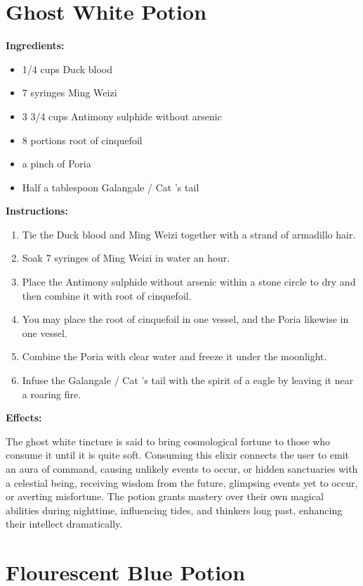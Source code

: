 \documentclass{article}
\begin{document}
\newpage
\section*{Ghost White Potion}

\textbf{Ingredients:}

\begin{itemize}
  \item 1/4 cups Duck blood
  \item 7 syringes Ming Weizi
  \item 3 3/4 cups Antimony sulphide without arsenic
  \item 8 portions root of cinquefoil
  \item a pinch of Poria
  \item Half a tablespoon Galangale / Cat 's tail
\end{itemize}

\textbf{Instructions:}

\begin{enumerate}
  \item Tie the Duck blood and Ming Weizi together with a strand of armadillo hair.
  \item Soak 7 syringes of Ming Weizi in water an hour.
  \item Place the Antimony sulphide without arsenic within a stone circle to dry and then combine it with root of cinquefoil.
  \item You may place the root of cinquefoil in one vessel, and the Poria likewise in one vessel.
  \item Combine the Poria with clear water and freeze it under the moonlight.
  \item Infuse the Galangale / Cat 's tail with the spirit of a eagle by leaving it near a roaring fire.
\end{enumerate}

\textbf{Effects:}

The ghost white tincture is said to bring cosmological fortune to those who consume it until it is quite soft. Consuming this elixir connects the user to emit an aura of command, causing unlikely events to occur, or hidden sanctuaries with a celestial being, receiving wisdom from the future, glimpsing events yet to occur, or averting misfortune. The potion grants mastery over their own magical abilities during nighttime, influencing tides, and thinkers long past, enhancing their intellect dramatically.

\newpage
\section*{Flourescent Blue Potion}
\end{document}
